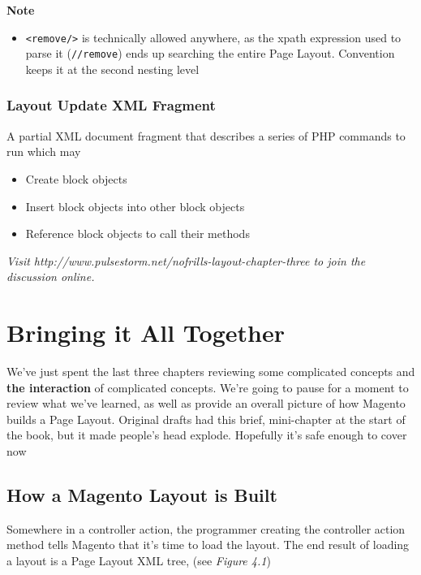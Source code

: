 \documentclass[oneside]{book}
\begin{document}
\textbf{Note}

\begin{itemize}
\item \footnotesize\texttt{\textless remove/\textgreater } \normalsize  is technically allowed anywhere, as the xpath expression used to parse it (\footnotesize\texttt{//remove}\normalsize) ends up searching the entire Page Layout.  Convention keeps it at the second nesting level
\end{itemize}


\subsection{Layout Update XML Fragment}

A partial XML document fragment that describes a series of PHP commands to run which may

\begin{itemize}
\item Create block objects
\item Insert block objects into other block objects
\item Reference block objects to call their methods
\end{itemize}


\emph{Visit http://www.pulsestorm.net/nofrills-layout-chapter-three to join the discussion online.}
\chapter{Bringing it All Together}
We've just spent the last three chapters reviewing some complicated concepts and \textbf{the interaction} of complicated concepts.  We're going to pause for a moment to review what we've learned, as well as provide an overall picture of how Magento builds a Page Layout.  Original drafts had this brief, mini-chapter at the start of the book, but it made people's head explode.  Hopefully it's safe enough to cover now

\section{How a Magento Layout is Built}

Somewhere in a controller action, the programmer creating the controller action method tells Magento that it's time to load the layout.  The end result of loading a layout is a Page Layout XML tree, (see \emph{Figure 4.1})
\end{document}
